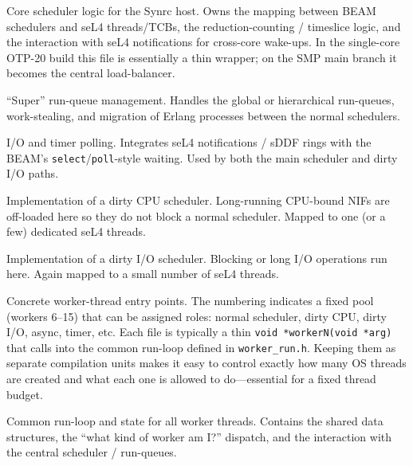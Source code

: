 \documentclass{article}
\begin{document}
\begin{description}[style=nextline]
  \item[\texttt{beam\_sched.c}]
    Core scheduler logic for the Synrc host.
    Owns the mapping between BEAM schedulers and seL4 threads/TCBs, the reduction-counting / timeslice logic, and the interaction with seL4 notifications for cross-core wake-ups.
    In the single-core OTP-20 build this file is essentially a thin wrapper; on the SMP main branch it becomes the central load-balancer.

  \item[\texttt{beam\_rq\_super.c}]
    ``Super'' run-queue management.
    Handles the global or hierarchical run-queues, work-stealing, and migration of Erlang processes between the normal schedulers.

  \item[\texttt{beam\_poll.c}]
    I/O and timer polling.
    Integrates seL4 notifications / sDDF rings with the BEAM's \texttt{select}/\texttt{poll}-style waiting.
    Used by both the main scheduler and dirty I/O paths.

  \item[\texttt{beam\_dirty\_cpu.c}]
    Implementation of a dirty CPU scheduler.
    Long-running CPU-bound NIFs are off-loaded here so they do not block a normal scheduler.
    Mapped to one (or a few) dedicated seL4 threads.

  \item[\texttt{beam\_dirty\_io.c}]
    Implementation of a dirty I/O scheduler.
    Blocking or long I/O operations run here.
    Again mapped to a small number of seL4 threads.

  \item[\texttt{beam\_worker6.c} \ldots\ \texttt{beam\_worker15.c}]
    Concrete worker-thread entry points.
    The numbering indicates a fixed pool (workers 6--15) that can be assigned roles: normal scheduler, dirty CPU, dirty I/O, async, timer, etc.
    Each file is typically a thin \texttt{void *workerN(void *arg)} that calls into the common run-loop defined in \texttt{worker\_run.h}.
    Keeping them as separate compilation units makes it easy to control exactly how many OS threads are created and what each one is allowed to do---essential for a fixed thread budget.

  \item[\texttt{worker\_run.h}]
    Common run-loop and state for all worker threads.
    Contains the shared data structures, the ``what kind of worker am I?'' dispatch, and the interaction with the central scheduler / run-queues.
\end{description}
\end{document}
